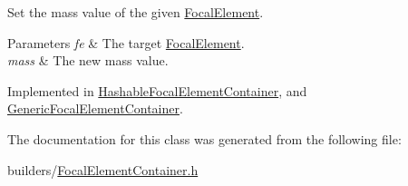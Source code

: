 Set the mass value of the given \hyperlink{classFocalElement}{Focal\+Element}. 


\begin{DoxyParams}{Parameters}
{\em fe} & The target \hyperlink{classFocalElement}{Focal\+Element}. \\
\hline
{\em mass} & The new mass value. \\
\hline
\end{DoxyParams}


Implemented in \hyperlink{classHashableFocalElementContainer_a16ac0c831312f31641aa716b19a3efed}{Hashable\+Focal\+Element\+Container}, and \hyperlink{classGenericFocalElementContainer_a33d167fa35d3e19ec214560c281681ea}{Generic\+Focal\+Element\+Container}.



The documentation for this class was generated from the following file\+:\begin{DoxyCompactItemize}
\item 
builders/\hyperlink{FocalElementContainer_8h}{Focal\+Element\+Container.\+h}\end{DoxyCompactItemize}
